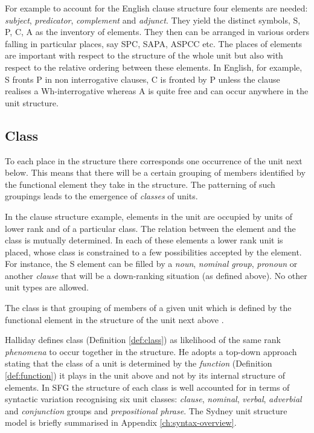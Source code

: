     For example to account for the English clause structure four elements are needed: \textit{subject}, \textit{predicator}, \textit{complement} and \textit{adjunct}. They yield the distinct symbols, S, P, C, A as the inventory of elements. They then can be arranged in various orders falling in particular places, say SPC, SAPA, ASPCC etc. The places of elements are important with respect to the structure of the whole unit but also with respect to the relative ordering between these elements. In English, for example, S fronts P in non interrogative clauses, C is fronted by P unless the clause realises a Wh-interrogative whereas A is quite free and can occur anywhere in the unit structure.

\subsection{Class}
    
    To each place in the structure there corresponds one occurrence of the unit next below. This means that there will be a certain grouping of members identified by the functional element they take in the structure. The patterning of such groupings leads to the emergence of \textit{classes} of units.
    
    In the clause structure example, elements in the unit are occupied by units of lower rank and of a particular class. The relation between the element and the class is mutually determined. In each of these elements a lower rank unit is placed, whose class is constrained to a few possibilities accepted by the element. For instance, the S element can be filled by a \textit{noun}, \textit{nominal group}, \textit{pronoun} or another \textit{clause} that will be a down-ranking situation (as defined above). No other unit types are allowed.
    
    \begin{definition}[Class]\label{def:class}
    	The class is that grouping of members of a given unit which is defined by the functional element in the structure of the unit next above \citep[49]{Halliday2002}.
    \end{definition}
    
    Halliday defines class (Definition \ref{def:class}) as likelihood of the same rank \textit{phenomena} to occur together in the structure. He adopts a top-down approach stating that the class of a unit is determined by the \textit{function} (Definition \ref{def:function}) it plays in the unit above and not by its internal structure of elements. In SFG the structure of each class is well accounted for in terms of syntactic variation recognising six unit classes: \textit{clause}, \textit{nominal}, \textit{verbal}, \textit{adverbial} and \textit{conjunction} groups and \textit{prepositional phrase}. The Sydney unit structure model is briefly summarised in Appendix \ref{ch:syntax-overview}.
    
